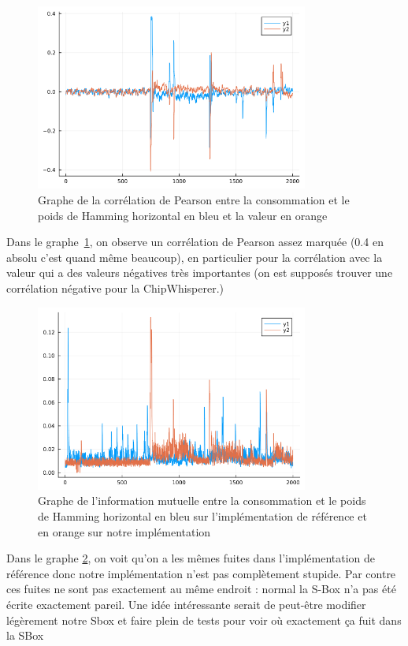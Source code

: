 \documentclass[12pt]{article}
\begin{document}
	\begin{figure}[H]
		\centering
		\includegraphics[width=0.8\textwidth]{horizontal_one_bit_corr}
		\caption{Graphe de la corrélation de Pearson entre la consommation et le poids de Hamming horizontal en bleu et la valeur en orange}
		\label{hcor}
	\end{figure}
	
	Dans le graphe \ref{hcor}, on observe un corrélation de Pearson assez marquée (0.4 en absolu c'est quand même beaucoup), en particulier pour la corrélation avec la valeur qui a des valeurs négatives très importantes (on est supposés trouver une corrélation négative pour la ChipWhisperer.)
	
	\begin{figure}[H]
		\centering
		\includegraphics[width=0.8\textwidth]{comp_ref_hHW}
		\caption{Graphe de l'information mutuelle entre la consommation et le poids de Hamming horizontal en bleu sur l'implémentation de référence et en orange sur notre implémentation}
		\label{compref}
	\end{figure}
	
	Dans le graphe \ref{compref}, on voit qu'on a les mêmes fuites dans l'implémentation de référence donc notre implémentation n'est pas complètement stupide. Par contre ces fuites ne sont pas exactement au même endroit : normal la S-Box n'a pas été écrite exactement pareil. Une idée intéressante serait de peut-être modifier légèrement notre Sbox et faire plein de tests pour voir où exactement ça fuit dans la SBox
	
\end{document}
